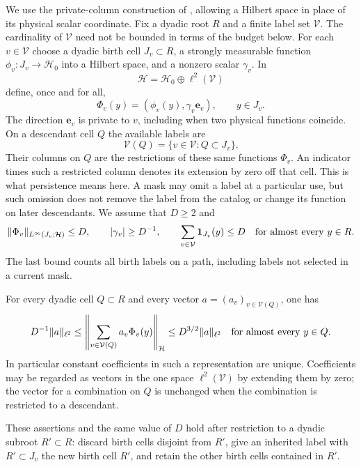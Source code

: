We use the private-column construction of \cite[Section~3]{H}, allowing
a Hilbert space in place of its physical scalar coordinate.
Fix a dyadic root $R$ and a finite label set $\mathcal V$.
The cardinality of $\mathcal V$ need not be bounded in terms of the
budget below.  For each
$v\in\mathcal V$ choose a dyadic birth cell $J_v\subset R$, a strongly
measurable function $\phi_v:J_v\to\mathcal H_0$ into a Hilbert space,
and a nonzero scalar $\gamma_v$.  In
\[
 \mathcal H=\mathcal H_0\oplus\ell^2(\mathcal V)
\]
define, once and for all,
\[
 \Phi_v(y)=(\phi_v(y),\gamma_v\mathbf e_v),\qquad y\in J_v.
\]
The direction $\mathbf e_v$ is private to $v$, including when two
physical functions coincide.  On a descendant cell $Q$ the available
labels are
\[
 \mathcal V(Q)=\{v\in\mathcal V:Q\subset J_v\}.
\]
Their columns on $Q$ are the restrictions of these same functions
$\Phi_v$.  An indicator times such a restricted column denotes its
extension by zero off that cell.  This is what persistence means here.
A mask may omit a
label at a particular use, but such omission does not remove the label
from the catalog or change its function on later descendants.  We
assume that $D\ge2$ and
\begin{equation}
 \|\Phi_v\|_{L^\infty(J_v;\mathcal H)}\le D,\qquad
 |\gamma_v|\ge D^{-1},\qquad
 \sum_{v\in\mathcal V}\mathbf1_{J_v}(y)\le D
 \quad\hbox{for almost every }y\in R.
 \label{eq:row-catalog-budget}
\end{equation}
The last bound counts all birth labels on a path, including labels not
selected in a current mask.

\begin{lemma}
\label{lem:row-catalog}
For every dyadic cell $Q\subset R$ and every vector
$a=(a_v)_{v\in\mathcal V(Q)}$, one has
\begin{equation}
 D^{-1}\|a\|_{\ell^2}
 \le \left\|\sum_{v\in\mathcal V(Q)}a_v\Phi_v(y)\right\|_{\mathcal H}
 \le D^{3/2}\|a\|_{\ell^2}
 \quad\hbox{for almost every }y\in Q.
 \label{eq:row-catalog-comparison}
\end{equation}
In particular constant coefficients in such a representation are
unique.  Coefficients may be regarded as vectors in the one space
$\ell^2(\mathcal V)$ by extending them by zero; the vector for a
combination on $Q$ is unchanged when the combination is restricted
to a descendant.

These assertions and the same value of $D$ hold after restriction to
a dyadic subroot $R'\subset R$: discard birth cells disjoint from
$R'$, give an inherited label with $R'\subset J_v$ the new birth
cell $R'$, and retain the other birth cells contained in $R'$.
\end{lemma}

